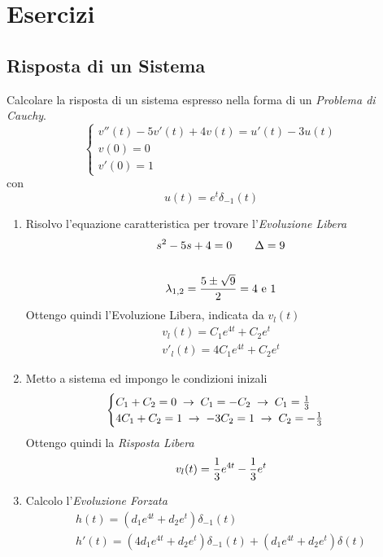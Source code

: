 \documentclass{article}
\begin{document}
	\section{Esercizi}
		\subsection{Risposta di un Sistema}
			Calcolare la risposta di un sistema espresso nella forma di un \textit{Problema di Cauchy}.
			\[
				\begin{cases}
					v''(t) - 5v'(t) + 4v(t) = u'(t) - 3u(t) \\
					v(0) = 0 \\
					v'(0) = 1
				\end{cases}
			\]
			con
			\[
				u(t) = e^t \delta_{-1}(t)
			\]
			\begin{enumerate}
				\item Risolvo l'equazione caratteristica per trovare l'\textit{Evoluzione Libera} \\
					  \[
					  	\begin{gathered}
					  		s^2 - 5s + 4 = 0\quad\quad \Delta = 9 \\
							\\
							\lambda_{1,2} = {{5 \pm \sqrt{9}}\over{2}} = 4 \text{ e } 1
					  	\end{gathered}
					  \]
					  Ottengo quindi l'Evoluzione Libera, indicata da $ v_l(t) $
					  \[
					  	\begin{gathered}
					  		v_l(t) = C_1e^{4t} + C_2e^t \\
							v'_l(t) = 4C_1e^{4t} + C_2e^t
					  	\end{gathered}
					  \]
				\item Metto a sistema ed impongo le condizioni inizali
					  \[
						\begin{cases}
						  	C_1 + C_2 = 0\; \rightarrow\; C_1 = -C_2\; \rightarrow\; C_1 = {{1}\over{3}} \\
							4C_1 + C_2 = 1\; \rightarrow\; -3C_2 = 1\; \rightarrow\; C_2 = -{{1}\over{3}}
						\end{cases}
					  \]
					  Ottengo quindi la \textit{Risposta Libera}
					  \[
					  	v_l(t) = {{1}\over{3}}e^{4t} - {{1}\over{3}}e^{t}
					  \]
				\item Calcolo l'\textit{Evoluzione Forzata}
					  \[
					  	\begin{gathered}
							h(t) = (d_1e^{4t} + d_2e^t)\delta_{-1}(t) \\
							h'(t) = (4d_1e^{4t} + d_2e^t)\delta_{-1}(t) + (d_1e^{4t} + d_2e^t)\delta(t) \\

\end{gathered}\]
\end{enumerate}
\end{document}
